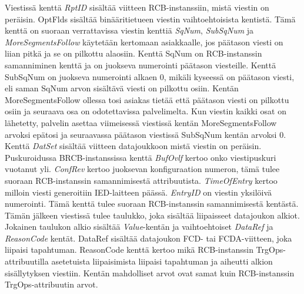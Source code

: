Viestissä kenttä \emph{RptID} sisältää viitteen RCB-instanssiin, mistä viestin on peräisin. OptFlds sisältää binääritietueen viestin vaihtoehtoisista kentistä. Tämä kenttä on suoraan verrattavissa viestin kenttiä \emph{SqNum}, \emph{SubSqNum} ja \emph{MoreSegmentsFollow} käytetään kertomaan asiakkaalle, jos päätason viesti on liian pitkä ja se on pilkottu alaosiin. Kenttä SqNum on RCB-instanssin samanniminen kenttä ja on juokseva numerointi päätason viesteille. Kenttä SubSqNum on juokseva numerointi alkaen 0, mikäli kyseessä on päätason viesti, eli saman SqNum arvon sisältävä viesti on pilkottu osiin. Kentän MoreSegmentsFollow ollessa tosi asiakas tietää että päätason viesti on pilkottu osiin ja seuraava osa on odotettavissa palvelimelta. Kun viestin kaikki osat on lähetetty, palvelin asettaa viimeisessä viestissä kentän MoreSegmentsFollow arvoksi epätosi ja seuraavassa päätason viestissä SubSqNum kentän arvoksi 0. Kenttä \emph{DatSet} sisältää viitteen datajoukkoon mistä viestin on peräisin. Puskuroidussa BRCB-instanssissa kenttä \emph{BufOvlf} kertoo onko viestipuskuri vuotanut yli. \emph{ConfRev} kertoo juoksevan konfiguraation numeron, tämä tulee suoraan RCB-instanssin samannimisestä attribuutista. \emph{TimeOfEntry} kertoo milloin viesti generoitiin IED-laitteen päässä. \emph{EntryID} on viestin yksilöivä numerointi. Tämä kenttä tulee suoraan RCB-instanssin samannimisestä kentästä. Tämän jälkeen viestissä tulee taulukko, joka sisältää liipaisseet datajoukon alkiot. Jokainen taulukon alkio sisältää \emph{Value}-kentän ja vaihtoehtoiset \emph{DataRef} ja \emph{ReasonCode} kentät. DataRef sisältää datajoukon FCD- tai FCDA-viitteen, joka liipaisi tapahtuman. ReasonCode kenttä kertoo mikä RCB-instanssin TrgOps-attribuutilla asetetuista liipaisimista liipaisi tapahtuman ja aiheutti alkion sisällytyksen viestiin. Kentän mahdolliset arvot ovat samat kuin RCB-instanssin TrgOps-attribuutin arvot.

